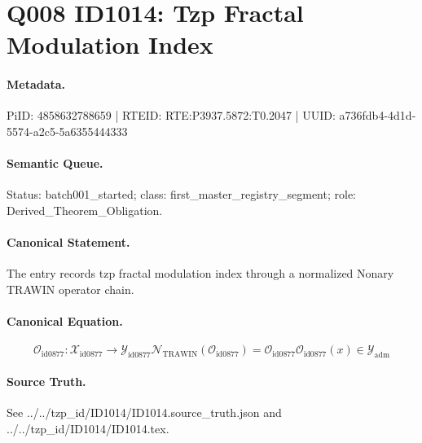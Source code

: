 \section*{Q008 ID1014: Tzp Fractal Modulation Index}
\paragraph{Metadata.}
PiID: 4858632788659 | RTEID: RTE:P3937.5872:T0.2047 | UUID: a736fdb4-4d1d-5574-a2c5-5a6355444333

\paragraph{Semantic Queue.}
Status: batch001\_started; class: first\_master\_registry\_segment; role: Derived\_Theorem\_Obligation.

\paragraph{Canonical Statement.}
The entry records tzp fractal modulation index through a normalized Nonary TRAWIN operator chain.

\paragraph{Canonical Equation.}
\[
\mathcal{O}_{\mathrm{id0877}}:\mathcal{X}_{\mathrm{id0877}}\longrightarrow\mathcal{Y}_{\mathrm{id0877}} \mathcal{N}_{\mathrm{TRAWIN}}(\mathcal{O}_{\mathrm{id0877}})=\mathcal{O}_{\mathrm{id0877}} \mathcal{O}_{\mathrm{id0877}}(x)\in\mathcal{Y}_{\mathrm{adm}}
\]

\paragraph{Source Truth.}
See ../../tzp\_id/ID1014/ID1014.source\_truth.json and ../../tzp\_id/ID1014/ID1014.tex.
